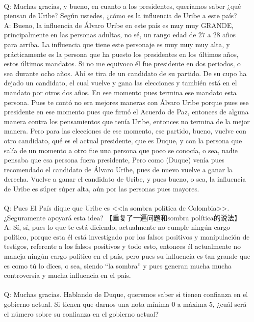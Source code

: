 \documentclass{phyasgn}\usepackage{nag}
\begin{document}
\\
Q: Muchas gracias, y bueno, en cuanto a los presidentes, queríamos saber ¿qué piensan de Uribe? Según ustedes, ¿cómo es la influencia de Uribe a este país?\\
A: Bueno, la influencia de Álvaro Uribe en este país es muy muy GRANDE, principalmente en las personas adultas, no sé, un rango edad de 27 a 28 años para arriba. La influencia que tiene este personaje es muy muy muy alta, y prácticamente es la persona que ha puesto los presidentes en los últimos años, estos últimos mandatos. Si no me equivoco él fue presidente en dos periodos, o sea durante ocho años. Ahí se tira de un candidato de su partido. De su cupo ha dejado un candidato, el cual vuelve y gana las elecciones y también está en el mandato por otros dos años. En ese momento pues termina ese mandato esta persona. Pues te contó no era mejores maneras con Álvaro Uribe porque pues ese presidente en ese momento pues que firmó el Acuerdo de Paz, entonces de alguna manera contra los pensamientos que tenía Uribe, entonces no termina de la mejor manera. Pero para las elecciones de ese momento, ese partido, bueno, vuelve con otro candidato, qué es el actual presidente, que es Duque, y con la persona que salía de un momento a otro fue una persona que poco se conocía, o sea, nadie pensaba que esa persona fuera presidente, Pero como (Duque) venía pues recomendado el candidato de Álvaro Uribe, pues de nuevo vuelve a ganar la derecha. Vuelve a ganar el candidato de Uribe, y pues bueno, o sea, la influencia de Uribe es súper súper alta, aún por las personas pues mayores. \\
\\
Q: Pues El País dique que Uribe es <<la sombra política de Colombia>>. ¿Seguramente apoyará esta idea?
【重复了一遍问题和sombra política的说法】\\
A: Sí, sí, pues lo que te está diciendo, actualmente no cumple ningún cargo político, porque esta él está investigado por los falsos positivos y manipulación de testigos, referente a los falsos positivos y todo esto, entonces él actualmente no maneja ningún cargo político en el país, pero pues su influencia es tan grande que es como tú lo dices, o sea, siendo “la sombra” y pues generan mucha mucha controversia y mucha influencia en el país. \\
\\
Q: Muchas gracias. Hablando de Duque, queremos saber si tienen confianza en el gobierno actual. Si tienen que darnos una nota mínima 0 a máxima 5, ¿cuál será el número sobre su confianza en el gobierno actual?\\
\end{document}
